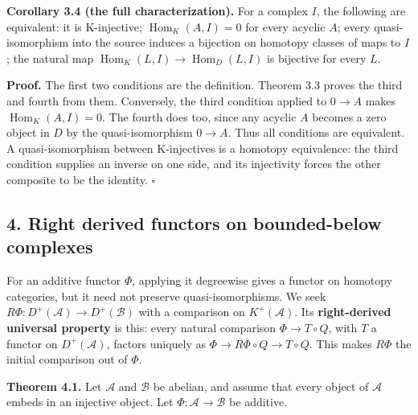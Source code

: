 \documentclass[
  english,
  11pt,
  a4paper,
]{article}
\begin{document}
\textbf{Corollary 3.4 (the full characterization).} For a complex \(I\),
the following are equivalent: it is K-injective;
\(\operatorname{Hom}_K(A,I)=0\) for every acyclic \(A\); every
quasi-isomorphism into the source induces a bijection on homotopy
classes of maps to \(I\); the natural map
\(\operatorname{Hom}_K(L,I)\to\operatorname{Hom}_D(L,I)\) is bijective
for every \(L\).

\textbf{Proof.} The first two conditions are the definition. Theorem 3.3
proves the third and fourth from them. Conversely, the third condition
applied to \(0\to A\) makes \(\operatorname{Hom}_K(A,I)=0\). The fourth
does too, since any acyclic \(A\) becomes a zero object in \(D\) by the
quasi-isomorphism \(0\to A\). Thus all conditions are equivalent. A
quasi-isomorphism between K-injectives is a homotopy equivalence: the
third condition supplies an inverse on one side, and its injectivity
forces the other composite to be the identity. \(\square\)

\subsection{4. Right derived functors on bounded-below
complexes}\label{injective-modules-and-bounded-below-derived-functors--4-right-derived-functors-on-bounded-below-complexes}

For an additive functor \(\Phi\), applying it degreewise gives a functor
on homotopy categories, but it need not preserve quasi-isomorphisms. We
seek \(R\Phi:D^+(\mathcal A)\to D^+(\mathcal B)\) with a comparison on
\(K^+(\mathcal A)\). Its \textbf{right-derived universal property} is
this: every natural comparison \(\Phi\to T\circ Q\), with \(T\) a
functor on \(D^+(\mathcal A)\), factors uniquely as
\(\Phi\to R\Phi\circ Q\to T\circ Q\). This makes \(R\Phi\) the initial
comparison out of \(\Phi\).

\textbf{Theorem 4.1.} Let \(\mathcal A\) and \(\mathcal B\) be abelian,
and assume that every object of \(\mathcal A\) embeds in an injective
object. Let \(\Phi:\mathcal A\to\mathcal B\) be additive.
\end{document}
